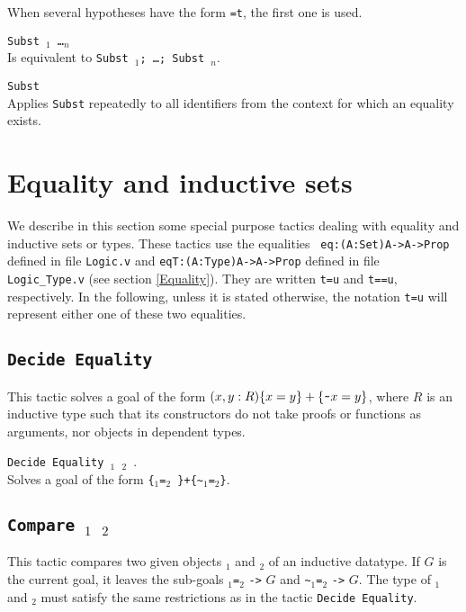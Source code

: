 \Rem 
When several hypotheses have the form {\tt \ident=t}, the first one is used.

\begin{Variants}
  \item {\tt Subst \ident$_1$ \dots \ident$_n$} \\
    Is equivalent to {\tt Subst \ident$_1$; \dots; Subst \ident$_n$}.
  \item {\tt Subst} \\
    Applies {\tt Subst} repeatedly to all identifiers from the context
    for which an equality exists.
\end{Variants}


\section{Equality and inductive sets}
We describe in this section some special purpose
tactics dealing with equality and inductive sets or
types.  These tactics use the equalities {\tt
eq:(A:Set)A->A->Prop} defined in file {\tt Logic.v}
and {\tt eqT:(A:Type)A->A->Prop} defined in file
{\tt Logic\_Type.v} (see section \ref{Equality}).
They are written {\tt t=u} and {\tt t==u},
respectively. In the following, unless it is stated
otherwise, the notation {\tt t=u} will represent
either one of these two equalities.

\subsection{\tt Decide Equality}
\label{DecideEquality}
This tactic solves a goal of the form
$(x,y:R)\{x=y\}+\{\verb|~|x=y\}$, where $R$ is an inductive type
such that its constructors do not take proofs or functions as
arguments, nor objects in dependent types.

\begin{Variants}
\item {\tt Decide Equality {\term}$_1$ {\term}$_2$ }.\\
 Solves a goal of the form {\tt \{}\term$_1${\tt =}\term$_2${\tt
\}+\{\verb|~|}\term$_1${\tt =}\term$_2${\tt \}}.
\end{Variants}

\subsection{\tt Compare \term$_1$ \term$_2$}
This tactic compares two given objects \term$_1$ and \term$_2$ 
of an inductive datatype. If $G$ is the current goal, it leaves the sub-goals
\term$_1${\tt =}\term$_2$ {\tt ->} $G$ and \verb|~|\term$_1${\tt =}\term$_2$
{\tt ->} $G$. The type
of \term$_1$ and \term$_2$ must satisfy the same restrictions as in the tactic
\texttt{Decide Equality}.

